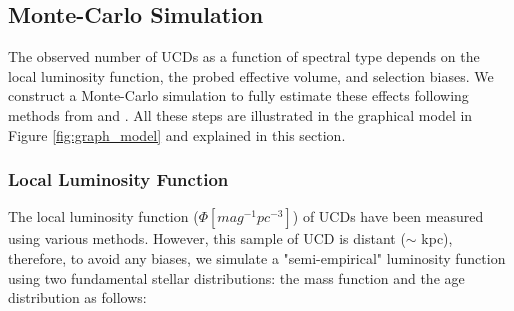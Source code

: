 \documentclass[manuscript]{aastex63}
\begin{document}
\subsection{Monte-Carlo Simulation}
The observed number of UCDs as a function of spectral type depends on the local luminosity function, the probed effective volume, and selection biases. We construct a Monte-Carlo simulation to fully estimate these effects following methods from \cite{1999ApJ...521..613R} and \cite{2004ApJS..155..191B}. All these steps are illustrated in the graphical model in Figure \ref{fig:graph_model} and explained in this section.

\subsubsection{ Local Luminosity Function} \label{step1simulation}
The local luminosity function ($\Phi [mag ^{-1} pc^{-3}]$) of UCDs have been measured using various methods. However, this sample of UCD is distant ($\sim$ kpc), therefore, to avoid any biases, we simulate a "semi-empirical" luminosity function using two fundamental stellar distributions: the mass function and the age distribution as follows: 
\end{document}
